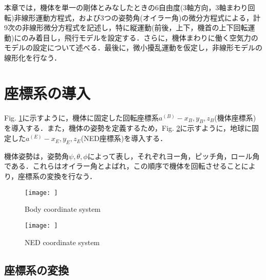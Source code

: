 
本章では，機体を単一の剛体とみなしたときの6自由度(3軸方向，3軸まわり回転)非線形運動方程式，および3つの姿勢角(オイラー角)の微分方程式による，計9次の非線形微分方程式を記述し，特に縦運動(前後，上下，機首の上下回転運動)にのみ着目し，飛行モデルを設定する．さらに，機体まわりに働く空気力のモデルの設定について述べる．最後に，微小擾乱運動を仮定し，非線形モデルの線形化を行なう．

\section{座標系の導入}
\label{sec:axis}

Fig. \ref{fig:body_axis}に示すように，機体に固定した回転座標系$a^{(B)}-x_B,y_B,z_B$(機体座標系)を導入する．また，機体の姿勢を定義するため，Fig. \ref{fig:ned_axis}に示すように，地球に固定した$a^{(E)}-x_E,y_E,z_E$(NED座標系)を導入する．

機体姿勢は，姿勢角$\psi,\theta,\phi$によって表し，それぞれヨー角，ピッチ角，ロール角である．これらはオイラー角とよばれ，この順序で機体を回転させることにより，座標系の変換を行なう．

\begin{figure}[H]
\centering
\texttt{[image: ]}
\caption{Body coordinate system}
\label{fig:body_axis}
\end{figure}

\begin{figure}[H]
\centering
\texttt{[image: ]}
\caption{NED coordinate system}
\label{fig:ned_axis}
\end{figure}


\subsection{座標系の変換}

